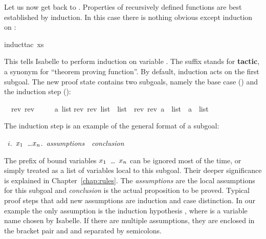 \begin{isabellebody}
\begin{isamarkuptxt}
Let us now get back to . Properties of recursively
defined functions are best established by induction. In this case there is
nothing obvious except induction on :%
\end{isamarkuptxt}%
\isamarkuptrue%
induct{\isacharunderscore}tac\ xs{\isacharparenright}\isamarkupfalse%
%
\begin{isamarkuptxt}%
\noindent{}%
This tells Isabelle to perform induction on variable . The suffix
 stands for \textbf{tactic},
a synonym for ``theorem proving function''.
By default, induction acts on the first subgoal. The new proof state contains
two subgoals, namely the base case () and the induction step
():
\begin{isabelle}%
\ {}{\isachardot}\ rev\ {\isacharparenleft}rev\ {\isacharbrackleft}{\isacharbrackright}{\isacharparenright}\ {\isacharequal}\ {\isacharbrackleft}{\isacharbrackright}\isanewline
\ {}{\isachardot}\ {\isasymAnd}a\ list{\isachardot}\isanewline
{}rev\ {\isacharparenleft}rev\ list{\isacharparenright}\ {\isacharequal}\ list\ {\isasymLongrightarrow}\ rev\ {\isacharparenleft}rev\ {\isacharparenleft}a\ {\isacharhash}\ list{\isacharparenright}{\isacharparenright}\ {\isacharequal}\ a\ {\isacharhash}\ list%
\end{isabelle}

The induction step is an example of the general format of a subgoal:
\begin{isabelle}
~$i$.~{\isasymAnd}$x\sb{1}$~\dots$x\sb{n}$.~{\it assumptions}~{\isasymLongrightarrow}~{\it conclusion}
\end{isabelle}
The prefix of bound variables \isasymAnd$x\sb{1}$~\dots~$x\sb{n}$ can be
ignored most of the time, or simply treated as a list of variables local to
this subgoal. Their deeper significance is explained in Chapter~\ref{chap:rules}.
The {\it assumptions}
are the local assumptions for this subgoal and {\it
  conclusion} is the actual proposition to be proved. 
Typical proof steps
that add new assumptions are induction and case distinction. In our example
the only assumption is the induction hypothesis , where  is a variable name chosen by Isabelle. If there
are multiple assumptions, they are enclosed in the bracket pair
 and
 and separated by semicolons.


\end{isamarkuptxt}
\end{isabellebody}
